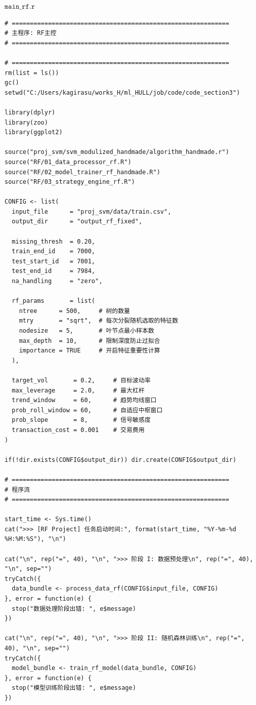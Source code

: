 \documentclass[11pt, a4paper]{article}
\begin{document}
$\texttt{main\_rf.r}$
\begin{verbatim}
# ============================================================
# 主程序: RF主控
# ============================================================

# ============================================================
rm(list = ls())
gc()
setwd("C:/Users/kagirasu/works_H/ml_HULL/job/code/code_section3")

library(dplyr)
library(zoo)
library(ggplot2)

source("proj_svm/svm_modulized_handmade/algorithm_handmade.r")
source("RF/01_data_processor_rf.R")
source("RF/02_model_trainer_rf_handmade.R")
source("RF/03_strategy_engine_rf.R")

CONFIG <- list(
  input_file      = "proj_svm/data/train.csv",
  output_dir      = "output_rf_fixed",

  missing_thresh  = 0.20,
  train_end_id    = 7000,
  test_start_id   = 7001,
  test_end_id     = 7984,
  na_handling     = "zero",
  
  rf_params       = list(
    ntree      = 500,     # 树的数量
    mtry       = "sqrt",  # 每次分裂随机选取的特征数
    nodesize   = 5,       # 叶节点最小样本数
    max_depth  = 10,      # 限制深度防止过拟合
    importance = TRUE     # 开启特征重要性计算
  ),
  
  target_vol       = 0.2,     # 目标波动率
  max_leverage     = 2.0,     # 最大杠杆
  trend_window     = 60,      # 趋势均线窗口
  prob_roll_window = 60,      # 自适应中枢窗口
  prob_slope       = 8,       # 信号敏感度
  transaction_cost = 0.001    # 交易费用
)

if(!dir.exists(CONFIG$output_dir)) dir.create(CONFIG$output_dir)

# ============================================================
# 程序流
# ============================================================

start_time <- Sys.time()
cat(">>> [RF Project] 任务启动时间:", format(start_time, "%Y-%m-%d %H:%M:%S"), "\n")

cat("\n", rep("=", 40), "\n", ">>> 阶段 I: 数据预处理\n", rep("=", 40), "\n", sep="")
tryCatch({
  data_bundle <- process_data_rf(CONFIG$input_file, CONFIG)
}, error = function(e) {
  stop("数据处理阶段出错: ", e$message)
})

cat("\n", rep("=", 40), "\n", ">>> 阶段 II: 随机森林训练\n", rep("=", 40), "\n", sep="")
tryCatch({
  model_bundle <- train_rf_model(data_bundle, CONFIG)
}, error = function(e) {
  stop("模型训练阶段出错: ", e$message)
})


\end{verbatim}
\end{document}
